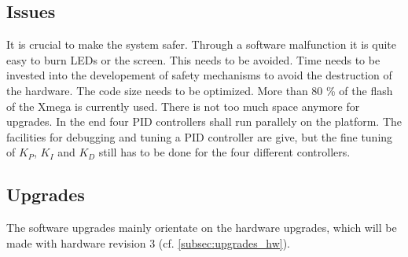 \subsection{Issues}
It is crucial to make the system safer. Through a software malfunction it is
quite easy to burn LEDs or the screen. This needs to be avoided. Time needs to
be invested into the developement of safety mechanisms to avoid the destruction
of the hardware.
\newpar
The code size needs to be optimized. More than 80 \% of the flash of the Xmega
is currently used. There is not too much space anymore for upgrades. 
\newpar
In the end four PID controllers shall run parallely on the platform. The
facilities for debugging and tuning a PID controller are give, but the fine
tuning of \ensuremath{K_P}, \ensuremath{K_I} and
\ensuremath{K_D} still has to be done for the four different controllers. 
\subsection{Upgrades}
The software upgrades mainly orientate on the hardware upgrades, which will be
made with hardware revision 3 (cf. \ref{subsec:upgrades_hw}).
